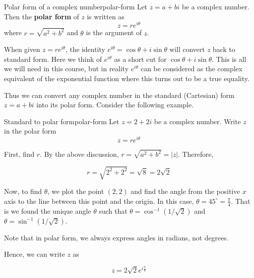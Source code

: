 \begin{definition}{Polar form of a complex number}{polar-form}
Let $z = a + bi$ be a complex number. Then the \textbf{polar form} of $z$ is written as 
\[
z = re^{i\theta}
\]
where $r = \sqrt{a^2 + b^2}$ and $\theta$ is the argument of $z$. 
\end{definition}

When given $z = re^{i\theta}$, the identity $e^{i\theta} = \cos\theta + i \sin\theta$ will convert $z$ back to standard form. Here we think of $ e^{i \theta}$ as a short cut for $ \cos \theta
+i\sin \theta$. This is all we will need in this course, but in
reality $e^{i \theta}$ can be considered as the complex equivalent of
the exponential function where this turns out to be a true equality.

\begin{center}
\end{center}

Thus we can convert any complex number in the standard (Cartesian) form $z = a+bi$
into its polar form. Consider the following example.

\begin{example}{Standard to polar form}{polar-form}
Let $z = 2 + 2i$ be a complex number. 
Write $z$ in the polar form 
\begin{equation*}
z = re^{i \theta}
\end{equation*}
\end{example}

\begin{solution}
First, find $r$.
By the above discussion, $r=\sqrt{
a^{2}+b^{2}} = |z|$. Therefore,

\begin{equation*}
r = \sqrt{2^{2} + 2^{2}} = \sqrt{8} =2\sqrt{2}
\end{equation*}

Now, to find $\theta$, we plot the point $(2, 2)$ and
find the angle from the positive $x$ axis to the line between this
point and the origin. In this case, $\theta = 45^{\circ} =
\frac{\pi}{4}$.  That is we found the unique angle $\theta$ such that 
$\theta = \cos^{-1}(1/\sqrt{2})$ and $\theta = \sin^{-1}(1/\sqrt{2})$. 

Note that in polar form, we always express angles in radians, not degrees.

Hence, we can write $z$ as

\begin{equation*}
z = 2\sqrt{2} e^{i\frac{\pi}{4}}
\end{equation*}

\end{solution}

